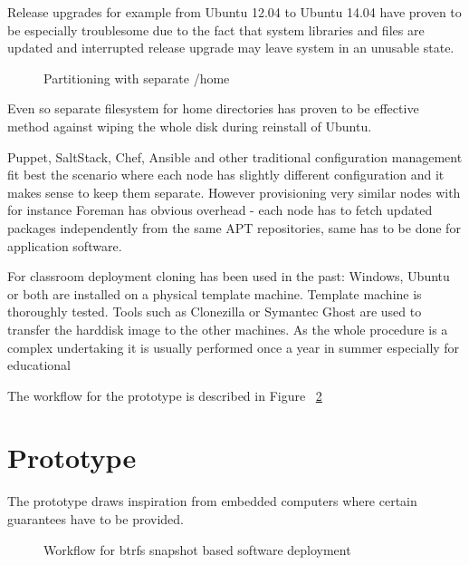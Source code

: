 \documentclass{article}
\begin{document}
Release upgrades for example from Ubuntu 12.04 to Ubuntu 14.04
have proven to be especially troublesome due to the fact that system libraries
and files are updated and interrupted release upgrade may leave system
in an unusable state.


\begin{figure}[!htb]
\centering
\scalebox{0.5}{}
\caption{Partitioning with separate /home}
\label{fig:traditional-partitioning}
\end{figure}

Even so separate filesystem for home directories has
proven to be effective method against wiping the whole disk
during reinstall of Ubuntu.

Puppet, SaltStack, Chef, Ansible and other traditional configuration
management fit best the scenario where each node has slightly different
configuration and it makes sense to keep them separate. However
provisioning very similar nodes with for instance Foreman has obvious
overhead - each node has to fetch updated packages independently from
the same APT repositories, same has to be done for application software.

For classroom deployment cloning has been used in the past:
Windows, Ubuntu or both are installed on a physical template machine.
Template machine is thoroughly tested.
Tools such as Clonezilla or Symantec Ghost are used to transfer the
harddisk image to the other machines.
As the whole procedure is a complex undertaking
it is usually performed once a year in summer especially for educational

The workflow for the prototype is described in Figure
~\ref{fig:butterknife-workflow}





\section{Prototype}


The prototype draws inspiration from embedded computers
where certain guarantees have to be provided.



\begin{figure}[!htb]
\centering
\scalebox{0.5}{}
\caption{Workflow for btrfs snapshot based software deployment}
\label{fig:butterknife-workflow}
\end{figure}
\end{document}
